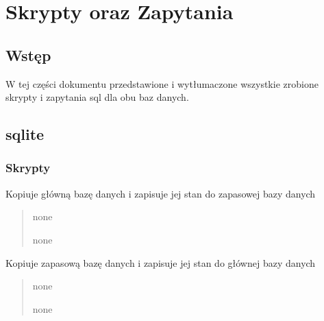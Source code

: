 \documentclass[letterpaper,10pt,polish]{sphinxmanual}
\begin{document}
\sphinxstepscope


\chapter{Skrypty oraz Zapytania}
\label{\detokenize{rozdzial4/index:skrypty-oraz-zapytania}}\label{\detokenize{rozdzial4/index::doc}}

\section{Wstęp}
\label{\detokenize{rozdzial4/index:wstep}}
\sphinxAtStartPar
W tej części dokumentu przedstawione i wytłumaczone wszystkie zrobione skrypty i zapytania sql dla obu baz danych.


\section{sqlite}
\label{\detokenize{rozdzial4/index:sqlite}}

\subsection{Skrypty}
\label{\detokenize{rozdzial4/index:skrypty}}

\begin{fulllineitems}

\pysigstartsignatures
{}
\pysigstopsignatures
\sphinxAtStartPar
Kopiuje główną bazę danych i zapisuje jej stan do zapasowej bazy danych
\begin{quote}\begin{description}
\sphinxAtStartPar
none

\sphinxAtStartPar
none

\end{description}\end{quote}

\end{fulllineitems}



\begin{fulllineitems}

\pysigstartsignatures
{}
\pysigstopsignatures
\sphinxAtStartPar
Kopiuje zapasową bazę danych i zapisuje jej stan do głównej bazy danych
\begin{quote}\begin{description}
\sphinxAtStartPar
none

\sphinxAtStartPar
none

\end{description}\end{quote}

\end{fulllineitems}
\end{document}
